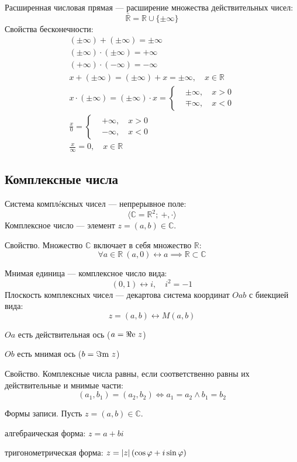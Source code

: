 {\bold Расширенная числовая прямая} --- расширение множества действительных 
чисел:
$$\bar{\mathbb{R}}=\mathbb{R}\cup\{\pm\infty\}$$
Свойства бесконечности:
$$\begin{gathered}
(\pm\infty)+(\pm\infty)=\pm\infty\\
(\pm\infty)\cdot(\pm\infty)=+\infty\\
(+\infty)\cdot(-\infty)=-\infty\\
x+(\pm\infty)=(\pm\infty)+x=\pm\infty,\quad x\in\mathbb{R}\\
x\cdot(\pm\infty)=(\pm\infty)\cdot x=\begin{cases*}
&\pm\infty,\quad x\greater 0\\
&\mp\infty,\quad x\less 0
\end{cases*}\\
\frac{x}{0}=\begin{cases*}
&+\infty,\quad x\greater 0\\
&-\infty,\quad x\less 0
\end{cases*}\\
\frac{x}{\infty}=0,\quad x\in\mathbb{R}
\end{gathered}$$

\newpage
\subsection{Комплексные числа}

{\bold Система комплéксных чисел} --- непрерывное поле:
$$\langle\mathbb{C}=\mathbb{R}^2;\ +,\cdot\rangle$$
{\bold Комплексное число} --- элемент $z=(a,b)\in\mathbb{C}$.
\begin{theorem}
{\bold Свойство.} Множество $\mathbb{C}$ включает в себя множество $\mathbb{R}$:
$$\forall a\in\mathbb{R}\ (a,0)\leftrightarrow a\implies\mathbb{R}\subset\mathbb{C}$$
\end{theorem}
{\bold Мнимая единица} --- комплексное число вида:
$$(0,1)\leftrightarrow i,\quad i^2=-1$$
{\bold Плоскость комплексных чисел} --- декартова система координат $Oab$ с биекцией вида:
$$z=(a,b)\leftrightarrow M(a,b)$$

\begin{list*}
\item $Oa$ есть действительная ось {\ital\color{desc}($a=\Re\text{e}\ z$)}
\item $Ob$ есть мнимая ось {\ital\color{desc}($b=\Im\text{m}\ z$)}
\end{list*}
\begin{theorem}
{\bold Свойство.} Комплексные числа {\ital равны}, если соответственно равны их действительные и мнимые части:
$$(a_1,b_1)=(a_2,b_2)\iff a_1=a_2\land b_1=b_2$$
\end{theorem}
\begin{theorem}
{\bold Формы записи.} Пусть $z=(a,b)\in\mathbb{C}$.
\begin{list*}
\item алгебраическая форма: $z=a+bi$
\item тригонометрическая форма: $z=\abs{z}(\cos\varphi+i\sin\varphi)$
\end{list*}
\end{theorem}

